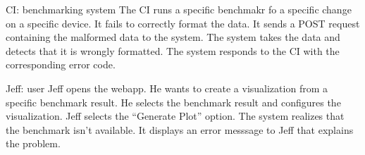 {CI: \Gls{benchmarking system}}
{The CI runs a specific benchmakr fo a specific change on a specific device. It fails to correctly format the data. It sends a POST request containing the malformed data to the system. The system takes the data and detects that it is wrongly formatted. The system responds to the CI with the corresponding error code.}

{Jeff: \Gls{user}}
{Jeff opens the webapp. He wants to create a \gls{visualization} from a specific benchmark result. He selects the benchmark result and configures the \gls{visualization}. Jeff selects the \enquote{Generate Plot} option. The system realizes that the benchmark isn't available. It displays an error messsage to Jeff that explains the problem.}
